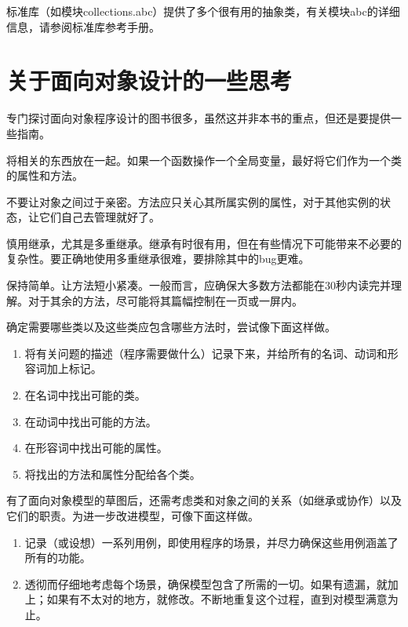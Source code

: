 标准库（如模块collections.abc）提供了多个很有用的抽象类，有关模块abc的详细信息，请参阅标准库参考手册。

\section{关于面向对象设计的一些思考}
专门探讨面向对象程序设计的图书很多，虽然这并非本书的重点，但还是要提供一些指南。
\begin{dinglist}{43}
    \item 将相关的东西放在一起。如果一个函数操作一个全局变量，最好将它们作为一个类的属性和方法。
    \item 不要让对象之间过于亲密。方法应只关心其所属实例的属性，对于其他实例的状态，让它们自己去管理就好了。
    \item 慎用继承，尤其是多重继承。继承有时很有用，但在有些情况下可能带来不必要的复杂性。要正确地使用多重继承很难，要排除其中的bug更难。
    \item 保持简单。让方法短小紧凑。一般而言，应确保大多数方法都能在30秒内读完并理解。对于其余的方法，尽可能将其篇幅控制在一页或一屏内。
\end{dinglist}

确定需要哪些类以及这些类应包含哪些方法时，尝试像下面这样做。
\begin{enumerate}
    \item 将有关问题的描述（程序需要做什么）记录下来，并给所有的名词、动词和形容词加上标记。
    \item 在名词中找出可能的类。
    \item 在动词中找出可能的方法。
    \item 在形容词中找出可能的属性。
    \item 将找出的方法和属性分配给各个类。
\end{enumerate}

有了面向对象模型的草图后，还需考虑类和对象之间的关系（如继承或协作）以及它们的职责。为进一步改进模型，可像下面这样做。
\begin{enumerate}
    \item 记录（或设想）一系列用例，即使用程序的场景，并尽力确保这些用例涵盖了所有的功能。
    \item 透彻而仔细地考虑每个场景，确保模型包含了所需的一切。如果有遗漏，就加上；如果有不太对的地方，就修改。不断地重复这个过程，直到对模型满意为止。
\end{enumerate}

